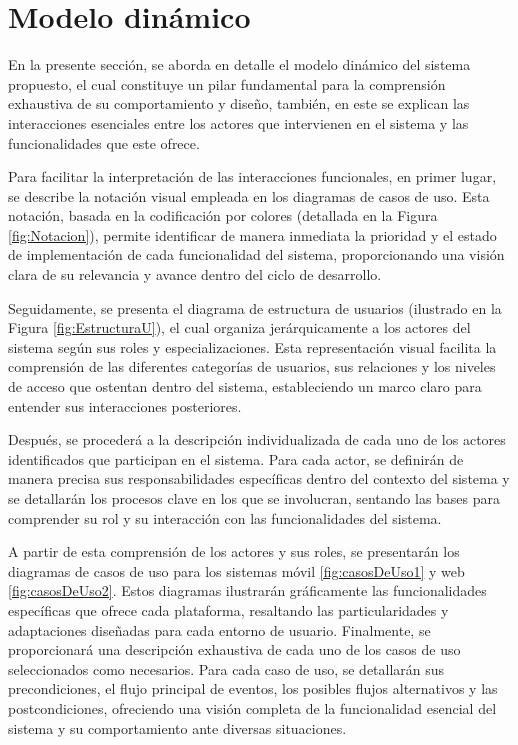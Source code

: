 \section{Modelo dinámico}	
\label{cap:modDinamico}

En la presente sección, se aborda en detalle el modelo dinámico del sistema propuesto, el cual constituye un pilar fundamental para la comprensión exhaustiva de su comportamiento y diseño, también, en este se explican las interacciones esenciales entre los actores que intervienen en el sistema y las funcionalidades que este ofrece.


Para facilitar la interpretación de las interacciones funcionales, en primer lugar, se describe la notación visual empleada en los diagramas de casos de uso. Esta notación, basada en la codificación por colores (detallada en la Figura \ref{fig:Notacion}), permite identificar de manera inmediata la prioridad y el estado de implementación de cada funcionalidad del sistema, proporcionando una visión clara de su relevancia y avance dentro del ciclo de desarrollo.


Seguidamente, se presenta el diagrama de estructura de usuarios (ilustrado en la Figura \ref{fig:EstructuraU}), el cual organiza jerárquicamente a los actores del sistema según sus roles y especializaciones. Esta representación visual facilita la comprensión de las diferentes categorías de usuarios, sus relaciones y los niveles de acceso que ostentan dentro del sistema, estableciendo un marco claro para entender sus interacciones posteriores.


Después, se procederá a la descripción individualizada de cada uno de los actores identificados que participan en el sistema. Para cada actor, se definirán de manera precisa sus responsabilidades específicas dentro del contexto del sistema y se detallarán los procesos clave en los que se involucran, sentando las bases para comprender su rol y su interacción con las funcionalidades del sistema.


A partir de esta comprensión de los actores y sus roles, se presentarán los diagramas de casos de uso para los sistemas móvil \ref{fig:casosDeUso1}  y web \ref{fig:casosDeUso2}. Estos diagramas ilustrarán gráficamente las funcionalidades específicas que ofrece cada plataforma, resaltando las particularidades y adaptaciones diseñadas para cada entorno de usuario.
Finalmente, se proporcionará una descripción exhaustiva de cada uno de los casos de uso seleccionados como necesarios. Para cada caso de uso, se detallarán sus precondiciones, el flujo principal de eventos, los posibles flujos alternativos y las postcondiciones, ofreciendo una visión completa de la funcionalidad esencial del sistema y su comportamiento ante diversas situaciones.



